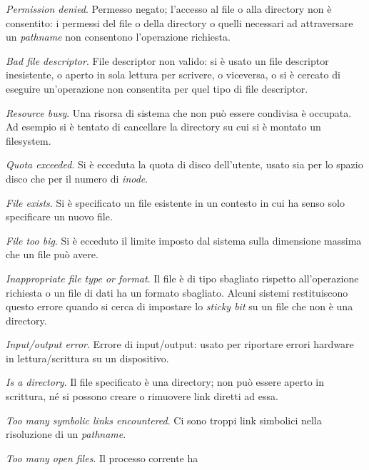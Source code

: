 \begin{basedescript}{\desclabelwidth{1.5cm}\desclabelstyle{\nextlinelabel}}
\item[\errcode{EACCES} \textit{Permission denied}.] Permesso negato; l'accesso
  al file o alla directory non è consentito: i permessi del file o della
  directory o quelli necessari ad attraversare un \textit{pathname} non
  consentono l'operazione richiesta. 
\item[\errcode{EBADF} \textit{Bad file descriptor}.] File descriptor non
  valido: si è usato un file descriptor inesistente, o aperto in sola lettura
  per scrivere, o viceversa, o si è cercato di eseguire un'operazione non
  consentita per quel tipo di file descriptor.
\item[\errcode{EBUSY} \textit{Resource busy}.] Una risorsa di sistema che non
  può essere condivisa è occupata. Ad esempio si è tentato di cancellare la
  directory su cui si è montato un filesystem.
\item[\errcode{EDQUOT} \textit{Quota exceeded}.] Si è ecceduta la quota di
  disco dell'utente, usato sia per lo spazio disco che per il numero di
  \textit{inode}.
\item[\errcode{EEXIST} \textit{File exists}.] Si è specificato un file
  esistente in un contesto in cui ha senso solo specificare un nuovo file.
\item[\errcode{EFBIG} \textit{File too big}.] Si è ecceduto il limite imposto
  dal sistema sulla dimensione massima che un file può avere.
\item[\errcode{EFTYPE} \textit{Inappropriate file type or format}.] Il file è
  di tipo sbagliato rispetto all'operazione richiesta o un file di dati ha un
  formato sbagliato. Alcuni sistemi restituiscono questo errore quando si
  cerca di impostare lo \textit{sticky bit} su un file che non è una
  directory.
\item[\errcode{EIO} \textit{Input/output error}.] Errore di input/output:
  usato per riportare errori hardware in lettura/scrittura su un dispositivo.
\item[\errcode{EISDIR} \textit{Is a directory}.] Il file specificato è una
  directory; non può essere aperto in scrittura, né si possono creare o
  rimuovere link diretti ad essa.
\item[\errcode{ELOOP} \textit{Too many symbolic links encountered}.] Ci sono
  troppi link simbolici nella risoluzione di un \textit{pathname}.
\item[\errcode{EMFILE} \textit{Too many open files}.] Il processo corrente ha

\end{basedescript}

